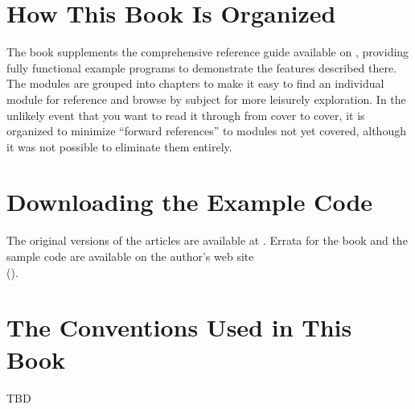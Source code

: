 \section*{How This Book Is Organized}

The book supplements the comprehensive reference guide available on
, providing fully functional
example programs to demonstrate the features described there. The
modules are grouped into chapters to make it easy to find an
individual module for reference and browse by subject for more
leisurely exploration. In the unlikely event that you want to read it
through from cover to cover, it is organized to minimize ``forward
references'' to modules not yet covered, although it was not possible
to eliminate them entirely.

\section*{Downloading the Example Code}

The original versions of the articles are available at
. Errata for the book and the sample
code are available on the author's web site\\
().

\section*{The Conventions Used in This Book}

TBD
